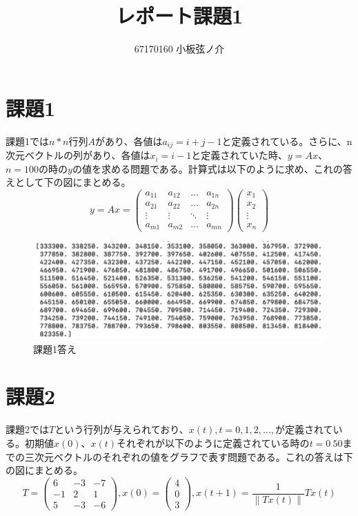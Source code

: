 \documentclass{jsarticle}
\title{レポート課題1}
\author{67170160 小板弦ノ介}
\begin{document}
\maketitle

\section{課題1} 
課題1では$n*n$行列$A$があり、各値は$a_{ij} = i + j - 1$と定義されている。さらに、n次元ベクトルの列があり、各値は$x_{i} = i - 1$と定義されていた時、$y = Ax$、$n = 100$の時の$y$の値を求める問題である。計算式は以下のように求め、これの答えとして下の図にまとめる。
\[
  y = Ax = \left(
    \begin{array}{cccc}
      a_{11} & a_{12} & \ldots & a_{1n} \\
      a_{21} & a_{22} & \ldots & a_{2n} \\
      \vdots & \vdots & \ddots & \vdots \\
      a_{m1} & a_{m2} & \ldots & a_{mn}
    \end{array}
  \right) 
  \left(
    \begin{array}{cccc}
      x_{1} \\
      x_{2} \\
      \vdots \\
      x_{n}
    \end{array}
  \right) 
\]
\begin{figure}[h]
\begin{center}
\includegraphics[width=.4\linewidth]{kadai1_1ans.pdf}
\hspace*{1mm}
\caption{課題1答え}
\end{center}
\end{figure}


\section{課題2}
課題2では$T$という行列が与えられており、$x(t), t = 0,1,2,\ldots,$が定義されている。初期値$x(0)$、$x(t)$それぞれが以下のように定義されている時の$t = 0 ~ 50$までの三次元ベクトルのそれぞれの値をグラフで表す問題である。これの答えは下の図にまとめる。
\[
  T = \left(
    \begin{array}{cccc}
      6 & -3 & -7 \\
      -1 & 2 & 1 \\
      5 & -3 & -6
    \end{array}
  \right) ,x(0) = \left(
    \begin{array}{cccc}
      4 \\
      0 \\
      3
    \end{array}
  \right),x(t + 1) = \frac{1}{\parallel Tx(t)\parallel}Tx(t)
\]
\end{document}
